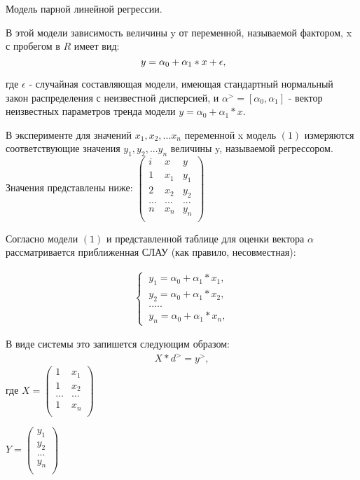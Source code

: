 \documentclass[__main__.tex]{subfiles}
\begin{document}
Модель парной линейной регрессии.

В этой модели зависимость величины y от переменной, называемой фактором, x с пробегом в $R$ имеет вид:
\begin{equation}
 \ y = \alpha_0 + \alpha_1 * x + \epsilon,
\llabel{eq:1}
\end{equation}

где $\epsilon$ - случайная составляющая модели, имеющая стандартный нормальный закон распределения с неизвестной дисперсией, и $\alpha^> = [\alpha_0 , \alpha_1 ]$ - вектор неизвестных параметров тренда модели $y = \alpha_0 + \alpha_1 * x$.

В эксперименте для значений $x_1, x_2, ... x_n$ переменной x модель $(1)$ измеряются соответствующие значения $y_1, y_2, ... y_n$ величины y, называемой регрессором. Значения представлены ниже:
 $\left(
 \begin{matrix}
 i & x & y \\
 1 & x_1 & y_1\\
 2 & x_2 & y_2 \\
 ... & ... & ...\\
 n & x_n & y_n \\
 \end{matrix}
 \right)$

Согласно модели $(1)$ и представленной таблице для оценки вектора $\alpha$ рассматривается приближенная СЛАУ (как правило, несовместная):

\begin{gather}
	\begin{cases}
		\ y_1 = \alpha_0 + \alpha_1 * x_1,\\
		\ y_2 = \alpha_0 + \alpha_1 * x_2,\\
		\ ..... \\
		\ y_n = \alpha_0 + \alpha_1 * x_n,
	\end{cases}
\end{gather}
 
В виде системы это запишется следующим образом:
\begin{gather}
	\label{2}
	X*d^{>} = y^{>}, 
\end{gather}
где 
$X = \left(
\begin{matrix}
1 & x_1\\
1 & x_2\\
... & ...\\
1 & x_n\\
\end{matrix}
\right)$ 

$Y = \left(
\begin{matrix}
y_1\\
y_2\\
...\\
y_n\\
\end{matrix}
\right)$ 
\end{document}
